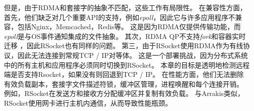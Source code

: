 但是，由于RDMA和套接字的抽象不匹配，这些工作有局限性。
在兼容性方面，首先，他们缺乏对几个重要API的支持，例如\textit {epoll}，因此它与许多应用程序不兼容，包括Nginx，Memcached，Redis等。
这是因为RDMA仅提供传输功能，而\textit {epoll}是与OS事件通知集成的文件抽象。
其次，RDMA QP不支持\textit {fork}和容器实时迁移 \cite{nsdi19freeflow}，因此RSocket也有同样的问题。
第三，由于RSocket使用RDMA作为有线协议，因此无法连接到常规TCP / IP对等体。
这是一个部署挑战，因为分布式系统中的所有主机和应用程序必须同时切换到RSocket。
本章的目标是透明地检测远程端是否支持Rsocket，如果没有则回退到TCP / IP。
在性能方面，他们无法删除有效负载副本，套接字文件描述符锁，缓冲区管理，进程唤醒和每个连接开销。
例如，RSocket在发送方和接收方分配缓冲区并复制有效负载。
与Arrakis类似，RSocket使用网卡进行主机内通信，从而导致性能瓶颈。





